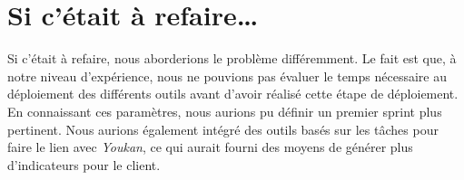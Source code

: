 \section{Si c'était à refaire…}

Si c'était à refaire, nous aborderions le problème différemment. Le fait est que, à notre niveau d'expérience, nous ne pouvions pas évaluer le temps nécessaire au déploiement des différents outils avant d'avoir réalisé cette étape de déploiement. En connaissant ces paramètres, nous aurions pu définir un premier sprint plus pertinent. Nous aurions également intégré des outils basés sur les tâches pour faire le lien avec \emph{Youkan}, ce qui aurait fourni des moyens de générer plus d'indicateurs pour le client.
